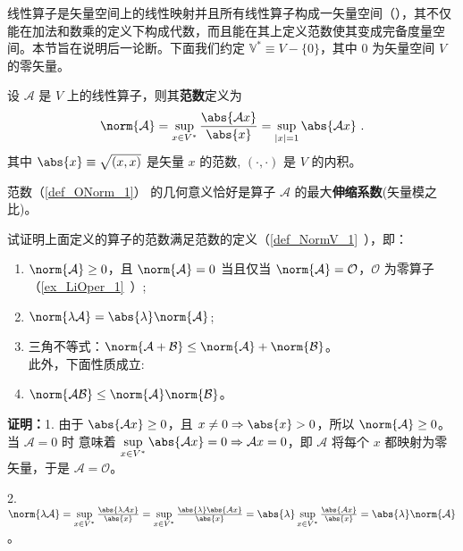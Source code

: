

线性算子是矢量空间上的线性映射并且所有线性算子构成一矢量空间（），其不仅能在加法和数乘的定义下构成代数，而且能在其上定义范数使其变成完备度量空间。本节旨在说明后一论断。下面我们约定 $\mathbb V^* \equiv V - \{0\}$，其中 $0$ 为矢量空间 $V$ 的零矢量。
\begin{definition}{}\label{def_ONorm_1}
设 $\mathcal A$ 是 $V$ 上的线性算子，则其\textbf{范数}定义为
\begin{equation}\label{eq_ONorm_1}
\norm{\mathcal A} = \sup_{x\in{V^*}}\frac{\abs{\mathcal Ax}}{\abs{x}} = \sup_{|x| = 1} \abs{\mathcal A x}~.
\end{equation}
其中 $\abs{x}\equiv\sqrt{(x,x)}$ 是矢量 $x$ 的范数, $(\cdot,\cdot)$ 是 $V$ 的内积。
\end{definition}
范数（\autoref{def_ONorm_1}） 的几何意义恰好是算子 $\mathcal A$ 的最大\textbf{伸缩系数}(矢量模之比)。
\begin{example}{}
试证明上面定义的算子的范数满足范数的定义（\autoref{def_NormV_1}~），即：
\begin{enumerate}
\item $\norm{\mathcal A}\geq0$，且 $\norm{\mathcal A}=0$ 当且仅当 $\norm{\mathcal A}=\mathcal O$，$\mathcal O$ 为零算子（\autoref{ex_LiOper_1}~）;
\item $\norm{\lambda \mathcal A}=\abs{\lambda}\norm{\mathcal A}$;
\item 三角不等式：$\norm{\mathcal A+\mathcal B}\leq\norm{\mathcal A}+\norm{\mathcal B}$。\\
此外，下面性质成立:\\
\item $\norm{\mathcal{AB}}\leq{\norm{\mathcal A}}\norm{\mathcal B}$。
\end{enumerate}
\end{example}
\textbf{证明：}1. 由于 $\abs{\mathcal A x}\geq0$，且 $x\neq0\Rightarrow\abs{x}>0$，所以
$\norm{\mathcal A}\geq0$。当 $\mathcal A=0$ 时 意味着 $\sup\limits_{x\in{V^*}}\abs{\mathcal A x}=0\Rightarrow\mathcal A x=0$，即 $\mathcal A$ 将每个 $x$ 都映射为零矢量，于是 $\mathcal A=\mathcal O$。

2.$\norm{\lambda\mathcal A}=\sup\limits_{x\in{V^*}}\frac{\abs{\lambda \mathcal Ax}}{\abs{x}}=\sup\limits_{x\in{V^*}}\frac{\abs{\lambda}\abs{ \mathcal Ax}}{\abs{x}}=\abs{\lambda}\sup\limits_{x\in{V^*}}\frac{\abs{\mathcal Ax}}{\abs{x}}=\abs{\lambda}\norm{\mathcal A}
$。

